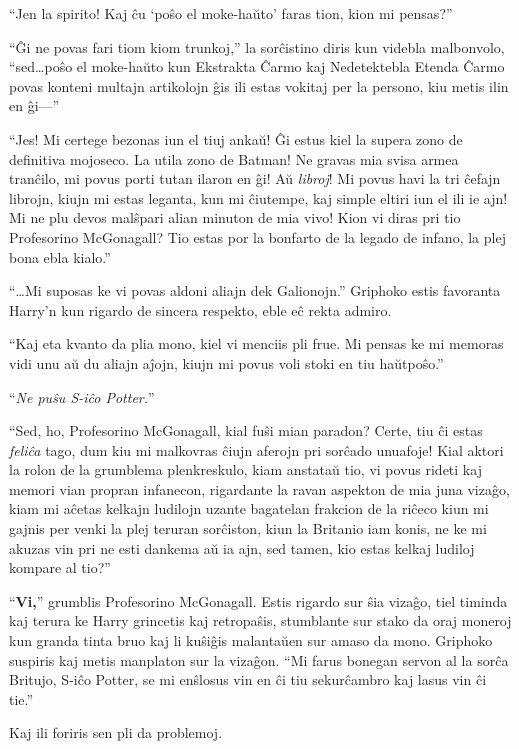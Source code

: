 ``Jen la spirito! Kaj ĉu `poŝo el moke-haŭto' faras tion, kion mi pensas?''

``Ĝi ne povas fari tiom kiom trunkoj,'' la sorĉistino diris kun
videbla malbonvolo, ``sed\ldots poŝo el moke-haŭto kun Ekstrakta
Ĉarmo kaj Nedetektebla Etenda Ĉarmo povas konteni multajn artikolojn
ĝis ili estas vokitaj per la persono, kiu metis ilin en ĝi—''

``Jes! Mi certege bezonas iun el tiuj ankaŭ! Ĝi estus kiel la supera
zono de definitiva mojoseco. La utila zono de Batman! Ne gravas mia
svisa armea tranĉilo, mi povus porti tutan ilaron en ĝi! Aŭ
\emph{libroj}! Mi povus havi la tri ĉefajn librojn, kiujn mi estas
leganta, kun mi ĉiutempe, kaj simple eltiri iun el ili ie ajn! Mi ne
plu devos malŝpari alian minuton de mia vivo! Kion vi diras pri tio
Profesorino McGonagall? Tio estas por la bonfarto de la legado de
infano, la plej bona ebla kialo.''

``\ldots Mi suposas ke vi povas aldoni aliajn dek Galionojn.''
Griphoko estis favoranta Harry'n kun rigardo de sincera respekto, eble
eĉ rekta admiro.

``Kaj eta kvanto da plia mono, kiel vi menciis pli frue. Mi pensas ke
mi memoras vidi unu aŭ du aliajn aĵojn, kiujn mi povus voli stoki en
tiu haŭtpoŝo.''

``\emph{Ne puŝu S-iĉo Potter.}''

``Sed, ho, Profesorino McGonagall, kial fuŝi mian paradon? Certe, tiu
ĉi estas \emph{feliĉa} tago, dum kiu mi malkovras ĉiujn aferojn pri
sorĉado unuafoje! Kial aktori la rolon de la grumblema plenkreskulo,
kiam anstataŭ tio, vi povus rideti kaj memori vian propran infanecon,
rigardante la ravan aspekton de mia juna vizaĝo, kiam mi aĉetas
kelkajn ludilojn uzante bagatelan frakcion de la riĉeco kiun mi gajnis
per venki la plej teruran sorĉiston, kiun la Britanio iam konis, ne ke
mi akuzas vin pri ne esti dankema aŭ ia ajn, sed tamen, kio estas
kelkaj ludiloj kompare al tio?''

``\textbf{Vi,}'' grumblis Profesorino McGonagall. Estis rigardo sur
ŝia vizaĝo, tiel timinda kaj terura ke Harry grincetis kaj retropaŝis,
stumblante sur stako da oraj moneroj kun granda tinta bruo kaj li kuŝiĝis
malantaŭen sur amaso da mono. Griphoko suspiris kaj metis manplaton
sur la vizaĝon. ``Mi farus bonegan servon al la sorĉa Britujo, S-iĉo
Potter, se mi enŝlosus vin en ĉi tiu sekurĉambro kaj lasus vin ĉi
tie.''

Kaj ili foriris sen pli da problemoj.

